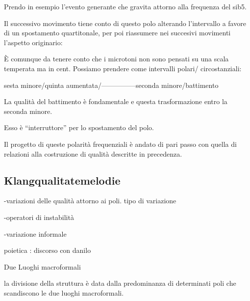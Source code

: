 Prendo in esempio l’evento generante che gravita attorno alla frequenza del sib5.

Il successivo movimento tiene conto di questo polo alterando l’intervallo a favore
di un spostamento quartitonale, per poi riassumere nei succesivi movimenti l’aspetto originario:

È comunque da tenere conto che i microtoni non sono pensati su una scala temperata ma in cent.
Possiamo prendere come intervalli polari/ circostanziali:

sesta minore/quinta aumentata/—————seconda minore/battimento

La qualità del battimento è fondamentale e questa trasformazione entro la seconda minore.

Esso è “interruttore” per lo spostamento del polo.

Il progetto di queste polarità frequenziali è andato di pari passo con quella di
relazioni alla costruzione di qualità descritte in precedenza.

\subsection{Klangqualitatemelodie}



-variazioni delle qualità attorno ai poli. tipo di variazione

-operatori di instabilità

-variazione informale

 poietica : discorso con danilo



Due Luoghi macroformali


la divisione della struttura è data dalla predominanza di determinati poli che scandiscono  le due luoghi macroformali.
